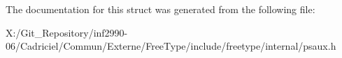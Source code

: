 The documentation for this struct was generated from the following file\-:\begin{DoxyCompactItemize}
\item 
X\-:/\-Git\-\_\-\-Repository/inf2990-\/06/\-Cadriciel/\-Commun/\-Externe/\-Free\-Type/include/freetype/internal/psaux.\-h\end{DoxyCompactItemize}
